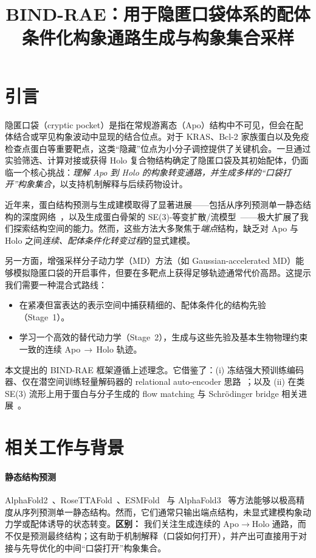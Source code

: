 \documentclass[11pt,a4paper,fontset=fandol]{ctexart}
\title{\bfseries
BIND-RAE：用于隐匿口袋体系的配体条件化构象通路生成与构象集合采样
}
\date{}
\begin{document}
\maketitle

\section{引言}

隐匿口袋（cryptic pocket）是指在常规游离态（Apo）结构中不可见，但会在配体结合或罕见构象波动中显现的结合位点。对于 KRAS、Bcl-2 家族蛋白以及免疫检查点蛋白等重要靶点，这类“隐藏”位点为小分子调控提供了关键机会。一旦通过实验筛选、计算对接或获得 Holo 复合物结构确定了隐匿口袋及其初始配体，仍面临一个核心挑战：\emph{理解 Apo 到 Holo 的构象转变通路，并生成多样的“口袋打开”构象集合}，以支持机制解释与后续药物设计。

近年来，蛋白结构预测与生成建模取得了显著进展——包括从序列预测单一静态结构的深度网络~\cite{jumper2021highly, baek2021accurate, lin2023evolutionary, abramson2024accurate}，以及生成蛋白骨架的 SE(3)-等变扩散/流模型~\cite{somnath2023aligned, costa2025accelerating, jing2024alphafold}——极大扩展了我们探索结构空间的能力。然而，这些方法大多聚焦于\emph{端点}结构，缺乏对 Apo 与 Holo 之间\emph{连续、配体条件化转变过程}的显式建模。

另一方面，增强采样分子动力学（MD）方法（如 Gaussian-accelerated MD）能够模拟隐匿口袋的开启事件，但要在多靶点上获得足够轨迹通常代价高昂。这提示我们需要一种混合式路线：

\begin{itemize}
    \item 在紧凑但富表达的表示空间中捕获精细的、配体条件化的结构先验（Stage~1）。
    \item 学习一个高效的替代动力学（Stage~2），生成与这些先验及基本生物物理约束一致的连续 Apo\,$\to$\,Holo 轨迹。
\end{itemize}

本文提出的 BIND-RAE 框架遵循上述理念。它借鉴了：(i) 冻结强大预训练编码器、仅在潜空间训练轻量解码器的 relational auto-encoder 思路~\cite{zheng2025diffusion}；以及 (ii) 在类 SE(3) 流形上用于蛋白与分子生成的 flow matching 与 Schrödinger bridge 相关进展~\cite{jin2024p2dflow, vargas2024scoobdoob}。

\section{相关工作与背景}

\paragraph{静态结构预测}
AlphaFold2~\cite{jumper2021highly}、RoseTTAFold~\cite{baek2021accurate}、ESMFold~\cite{lin2023evolutionary} 与 AlphaFold3~\cite{abramson2024accurate} 等方法能够以极高精度从序列预测单一静态结构。然而，它们通常只输出端点结构，未显式建模构象动力学或配体诱导的状态转变。\textbf{区别：} 我们关注生成连续的 Apo$\to$Holo 通路，而不仅是预测最终结构；这有助于机制解释（口袋如何打开），并产出可直接用于对接与先导优化的中间“口袋打开”构象集合。
\end{document}
